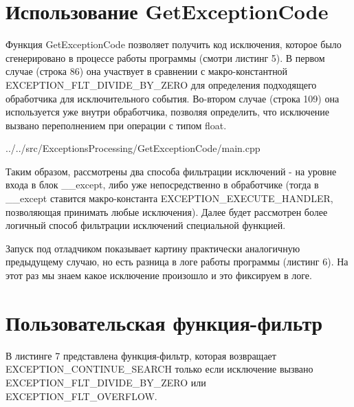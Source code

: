 \documentclass[a4paper, 12pt]{report}		%
\begin{document}

\chapter*{Использование GetExceptionCode}

Функция GetExceptionCode позволяет получить код исключения, которое было сгенерировано в процессе работы программы (смотри листинг 5). В первом случае (строка 86) она участвует в сравнении с макро-константной EXCEPTION\_FLT\_DIVIDE\_BY\_ZERO для определения подходящего обработчика для исключительного события. Во-втором случае (строка 109) она используется уже внутри обработчика, позволяя определить, что исключение вызвано переполнением при операции с типом float.


{../../src/ExceptionsProcessing/GetExceptionCode/main.cpp}

Таким образом, рассмотрены два способа фильтрации исключений - на уровне входа в блок \_\_except, либо уже непосредственно в обработчике (тогда в \_\_except ставится макро-константа EXCEPTION\_EXECUTE\_HANDLER, позволяющая принимать любые исключения). Далее будет рассмотрен более логичный способ фильтрации исключений специальной функцией.

Запуск под отладчиком показывает картину практически аналогичную предыдущему случаю, но есть разница в логе работы программы (листинг 6). На этот раз мы знаем какое исключение произошло и это фиксируем в логе.




\chapter*{Пользовательская функция-фильтр}

В листинге 7 представлена функция-фильтр, которая возвращает \\ EXCEPTION\_CONTINUE\_SEARCH только если исключение вызвано \\ EXCEPTION\_FLT\_DIVIDE\_BY\_ZERO или EXCEPTION\_FLT\_OVERFLOW.
\end{document}
